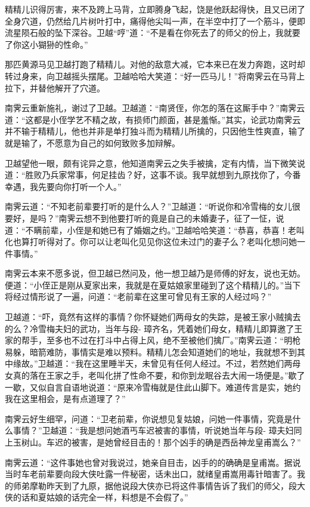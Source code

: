 \documentclass[12pt,oneside]{book}
\begin{document}
精精儿识得厉害，来不及跨上马背，立即腾身飞起，饶是他跃起得快，且又已闭了全身穴道，仍然给几片树叶打中，痛得他尖叫一声，在半空中打了一个筋斗，便即流星陨石般的坠下深谷。卫越``哼''道：``不是看在你死去了的师父的份上，我就要了你这小猢狲的性命。''

那匹黄源马见卫越打跑了精精儿。对他的敌意大减，它本来已在发力奔跑，这时却转过身来，向卫越摇头摆尾。卫越哈哈大笑道：``好一匹马儿！''将南霁云在马背上拉下，并替他解开了穴道。

南霁云重新施礼，谢过了卫越。卫越道：``南贤侄，你怎的落在这厮手中？''南霁云道：``这都是小侄学艺不精之故，有损师门颜面，甚是羞惭。''其实，论武功南霁云并不输于精精儿，他也并非是单打独斗而为精精儿所擒的，只因他生性爽直，输了就是输了，不愿意为自己的如何致败多加辩解。

卫越望他一眼，颇有诧异之意，他知道南霁云之失手被擒，定有内情，当下微笑说道：``胜败乃兵家常事，何足挂齿？好，这事不谈。我早就想到九原找你了，今番幸遇，我先要向你打听一个人。''

南霁云道：``不知老前辈要打听的是什么人？''卫越道：``听说你和冷雪梅的女儿很要好，是吗？''南霁云想不到他要打听的竟是自己的未婚妻子，征了一怔，说道：``不瞒前辈，小侄是和她已有了婚姻之约。''卫越哈哈笑道：``恭喜，恭喜！老叫化也算打听得对了。你可以让老叫化见见你这位未过门的妻子么？老叫化想问她一件事情。''

南霁云本来不愿多说，但卫越已然问及，他一想卫越乃是师傅的好友，说也无妨。便道：``小侄正是刚从夏家出来，我就是在夏姑娘家里碰到了这个精精儿的。''当下将经过情形说了一遍，问道：``老前辈在这里可曾见有王家的人经过吗？''

卫越道：``吓，竟然有这样的事情？你怀疑她们两母女的失踪，是被王家小贼擒去的么？冷雪梅夫妇的武功，当年与段-
璋齐名，凭着她们母女，精精儿即算邀了王家的帮手，至多也不过在打斗中占得上风，绝不至被他们擒厂。''南霁云道：``明枪易躲，暗箭难防，事情实是难以预料。精精儿怎会知道她们的地址，我就想不到其中缘故。''卫越道：``我在这里睡半天，未曾见有任何人经过。不过，若然她们两母女真的落在王家之手，老叫化拼了性命不要，和你到龙眠谷去大闹一场便是。''歇了一歇，又似自言自语地说道：``原来冷雪梅就是住此山脚下。难道传言是实，她约我在这里相会，是有点道理了？''

南霁云好生细罕，问道：``卫老前辈，你说想见复姑娘，问她一件事情，究竟是什么事情？''卫越道：``我是想问她酒丐车迟被害的事情，听说她当年与段-
璋夫妇同上玉树山。车迟的被害，是她曾经目击的！那个凶手的确是西岳神龙皇甫嵩么？''

南霁云道：``这件事她也曾对我说过，她亲自目击，凶手的的确确是皇甫嵩。据说当时车老前辈要向段大侠吐露一件秘密，话未出口，就绪皇甫嵩用毒针暗害了。我的师弟摩勒昨天到了九原，据他说段大侠亦已将这件事情告诉了我们的师父，段大侠的话和夏姑娘的话完全一样，料想是不会假了。''
\end{document}
